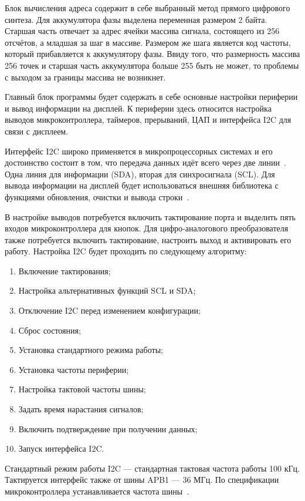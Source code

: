 	Блок вычисления адреса содержит в себе выбранный метод прямого цифрового синтеза. Для аккумулятора фазы выделена переменная размером 2 байта. Старшая часть отвечает за адрес ячейки массива сигнала, состоящего из 256 отсчётов, а младшая за шаг в массиве. Размером же шага является код частоты, который прибавляется к аккумулятору фазы. Ввиду того, что размерность массива 256 точек и старшая часть аккумулятора больше 255 быть не может, то проблемы с выходом за границы массива не возникнет.
	
	Главный блок программы будет содержать в себе основные настройки периферии и вывод информации на дисплей. К периферии здесь относится настройка выводов микроконтроллера, таймеров, прерываний, ЦАП и интерфейса I2C для связи с дисплеем. 
	
	Интерфейс I2C широко применяется в микропроцессорных системах и его достоинство состоит в том, что передача данных идёт всего через две линии~\cite{schemat}. Одна линия для информации (SDA), вторая для синхросигнала (SCL). Для вывода информации на дисплей будет использоваться внешняя библиотека с функциями обновления, очистки и вывода строки~\cite{libdisp}. 
	
	В настройке выводов потребуется включить тактирование порта и выделить пять входов микроконтроллера для кнопок. Для цифро-аналогового преобразователя также потребуется включить тактирование, настроить выход и активировать его работу. Настройка I2C будет проходить по следующему алгоритму:
	
	\begin{enumerate}
	\item Включение тактирования;
	\item Настройка альтернативных функций SCL и SDA;
	\item Отключение I2C перед изменением конфигурации;
	\item Сброс состояния;
	\item Установка стандартного режима работы;
	\item Установка частоты периферии;
	\item Настройка тактовой частоты шины;
	\item Задать время нарастания сигналов;
	\item Включить подтверждение при получении данных;
	\item Запуск интерфейса I2C.
	\end{enumerate}
	
	Стандартный режим работы I2C --- стандартная тактовая частота работы 100 кГц. Тактируется интерфейс также от шины APB1 --- 36 МГц. По спецификации микроконтроллера устанавливается частота шины~\cite{f103}.
	
